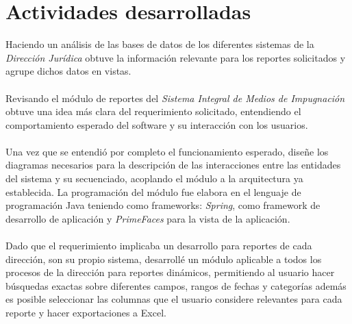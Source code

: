 \documentclass{article}
\begin{document}
\section{Actividades desarrolladas}
Haciendo un análisis de las bases de datos de los diferentes  sistemas  de la \textit{Dirección Jurídica} obtuve la información relevante para los reportes solicitados y agrupe dichos datos en vistas. \\ \\
Revisando el módulo de reportes del \textit{Sistema Integral de Medios de Impugnación} obtuve una idea más clara del requerimiento solicitado, entendiendo el comportamiento esperado del software y su interacción con los usuarios. \\ \\
Una vez que se entendió por completo el funcionamiento esperado, diseñe los diagramas necesarios para la descripción de las interacciones entre las entidades del sistema y su secuenciado, acoplando el módulo a la arquitectura ya establecida. La programación del módulo fue elabora en el lenguaje de programación Java teniendo como frameworks: \textit{Spring}, como framework de desarrollo de aplicación y \textit{PrimeFaces} para la vista de la aplicación. \\ \\
Dado que el requerimiento implicaba un desarrollo para reportes de cada dirección, son su propio sistema, desarrollé un módulo aplicable a todos los procesos de la dirección para reportes dinámicos, permitiendo al usuario hacer búsquedas exactas sobre diferentes campos, rangos de fechas y categorías además es posible seleccionar  las columnas que el usuario considere relevantes para cada reporte y hacer exportaciones a Excel.\\ \\
\end{document}
